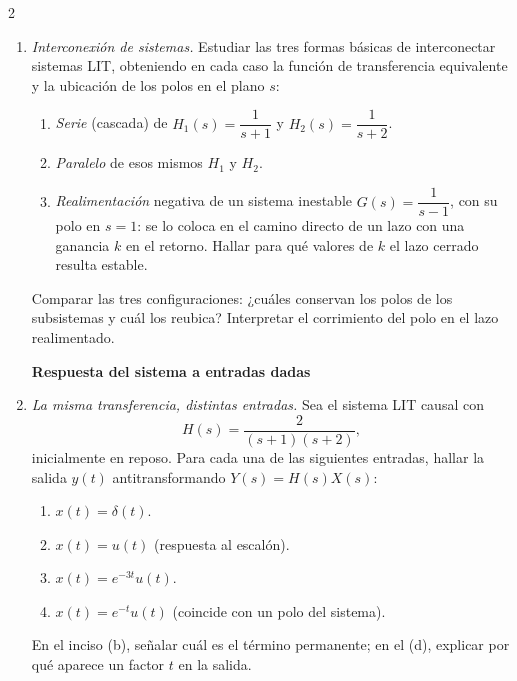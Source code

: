 \documentclass[10pt,a4paper]{article}
\begin{document}
\begin{multicols}{2}
\begin{enumerate}
			\item \emph{Interconexión de sistemas.} Estudiar las tres formas básicas de interconectar sistemas LIT, obteniendo en cada caso la función de transferencia equivalente y la ubicación de los polos en el plano $s$:
			\begin{enumerate}
				\item \emph{Serie} (cascada) de $H_1(s) = \dfrac{1}{s+1}$ y $H_2(s) = \dfrac{1}{s+2}$.
				\item \emph{Paralelo} de esos mismos $H_1$ y $H_2$.
				\item \emph{Realimentación} negativa de un sistema inestable $G(s) = \dfrac{1}{s-1}$, con su polo en $s=1$: se lo coloca en el camino directo de un lazo con una ganancia $k$ en el retorno. Hallar para qué valores de $k$ el lazo cerrado resulta estable.
			\end{enumerate}
			Comparar las tres configuraciones: ¿cuáles conservan los polos de los subsistemas y cuál los reubica? Interpretar el corrimiento del polo en el lazo realimentado.

			\textbf{Respuesta del sistema a entradas dadas}
			\item \emph{La misma transferencia, distintas entradas.} Sea el sistema LIT causal con
			\[
				H(s) = \frac{2}{(s+1)(s+2)},
			\]
			inicialmente en reposo. Para cada una de las siguientes entradas, hallar la salida $y(t)$ antitransformando $Y(s) = H(s)X(s)$:
			\begin{enumerate}
				\item $x(t) = \delta(t)$.
				\item $x(t) = u(t)$ \hfill (respuesta al escalón).
				\item $x(t) = e^{-3t}u(t)$.
				\item $x(t) = e^{-t}u(t)$ \hfill (coincide con un polo del sistema).
			\end{enumerate}
			En el inciso (b), señalar cuál es el término permanente; en el (d), explicar por qué aparece un factor $t$ en la salida.


\end{enumerate}
\end{multicols}
\end{document}
